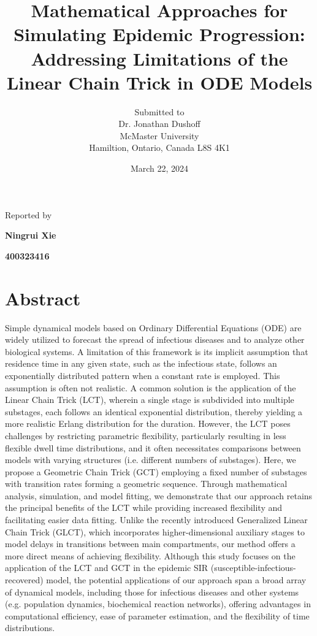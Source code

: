 \documentclass[12pt]{article}
\begin{document}
\title{Mathematical Approaches for Simulating Epidemic Progression: Addressing Limitations of the Linear Chain Trick in ODE Models}

\author{Submitted to\\ Dr. Jonathan Dushoff 
\\McMaster University\\Hamiltion, Ontario, Canada L8S 4K1}
\date {March 22, 2024}
\maketitle


\centerline{Reported by}
\centerline{\textbf{Ningrui Xie}}
\centerline{\textbf{400323416}}


\newpage
\section{Abstract}
Simple dynamical models based on Ordinary Differential Equations (ODE) are widely utilized to forecast the spread of infectious diseases and to analyze other biological systems. A limitation of this framework is its implicit assumption that residence time in any given state, such as the infectious state, follows an exponentially distributed pattern when a constant rate is employed. This assumption is often not realistic. A common solution is the application of the Linear Chain Trick (LCT), wherein a single stage is subdivided into multiple substages, each follows an identical exponential distribution, thereby yielding a more realistic Erlang distribution for the duration. However, the LCT poses challenges by restricting parametric flexibility, particularly resulting in less flexible dwell time distributions, and it often necessitates comparisons between models with varying structures (i.e. different numbers of substages). Here, we propose a Geometric Chain Trick (GCT) employing a fixed number of substages with transition rates forming a geometric sequence. Through mathematical analysis, simulation, and model fitting, we demonstrate that our approach retains the principal benefits of the LCT while providing increased flexibility and facilitating easier data fitting. Unlike the recently introduced Generalized Linear Chain Trick (GLCT), which incorporates higher-dimensional auxiliary stages to model delays in transitions between main compartments, our method offers a more direct means of achieving flexibility. Although this study focuses on the application of the LCT and GCT in the epidemic SIR (susceptible-infectious-recovered) model, the potential applications of our approach span a broad array of dynamical models, including those for infectious diseases and other systems (e.g. population dynamics, biochemical reaction networks), offering advantages in computational efficiency, ease of parameter estimation, and the flexibility of time distributions.
\end{document}
